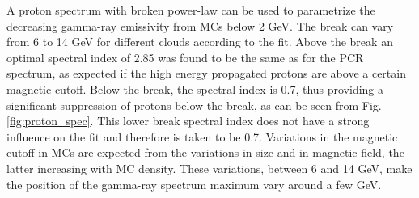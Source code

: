 A proton spectrum with broken power-law can be used to parametrize the decreasing gamma-ray emissivity from MCs below 2 GeV. The break can vary from 6 to 14 GeV for different clouds according to the fit. Above the break an optimal spectral index of 2.85 was found to be the same as for the PCR spectrum, as expected if the high energy propagated protons are above a certain magnetic cutoff. Below the break, the spectral index is 0.7, thus providing a significant suppression of protons below the break, as can be seen from Fig. \ref{fig:proton_spec}. This lower break spectral index does not have a strong influence on the fit and therefore is taken to be 0.7.
Variations in the magnetic cutoff in MCs are expected from the variations in size and in magnetic field, the latter increasing with MC density. \cite{Crutcher2012} 
These variations, between 6 and 14 GeV, make the position of the gamma-ray spectrum maximum vary around a few GeV.

